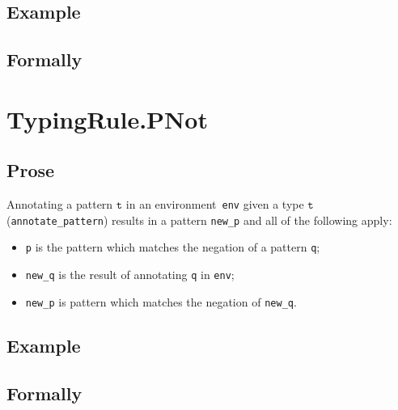 \documentclass{book}
\newcommand\vt[0]{\texttt{t}}
\begin{document}
\begin{itemize}
  \subsection{Example}



\begin{emptyformal}
    \subsection{Formally}
\end{emptyformal}


\section{TypingRule.PNot \label{sec:TypingRule.PNot}}

  \subsection{Prose}
   Annotating a pattern $\vt$ in an environment~\texttt{env} given a type $\vt$ (\texttt{annotate\_pattern}) results in a pattern \texttt{new\_p} and all of the following apply:
   \begin{itemize}
   \item \texttt{p} is the pattern which matches the negation of a pattern \texttt{q};
   \item \texttt{new\_q} is the result of annotating \texttt{q} in \texttt{env};
   \item \texttt{new\_p} is pattern which matches the negation of \texttt{new\_q}.
   \end{itemize}

  \subsection{Example}



\begin{emptyformal}
    \subsection{Formally}
\end{emptyformal}


\end{itemize}
\end{document}
